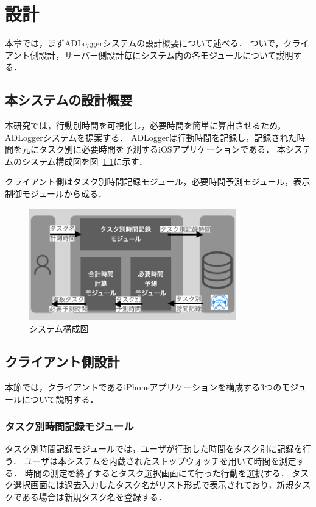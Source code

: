 \chapter{設計}
本章では，まずADLoggerシステムの設計概要について述べる．
ついで，クライアント側設計，サーバー側設計毎にシステム内の各モジュールについて説明する．

\section{本システムの設計概要}
本研究では，行動別時間を可視化し，必要時間を簡単に算出させるため，ADLoggerシステムを提案する．
ADLoggerは行動時間を記録し，記録された時間を元にタスク別に必要時間を予測するiOSアプリケーションである．
本システムのシステム構成図を図~\ref{fig:system}に示す．

クライアント側はタスク別時間記録モジュール，必要時間予測モジュール，表示制御モジュールから成る．

\begin{figure}[tb]
	\begin{center}
	\includegraphics[width=9cm]{images/5/3.png}
	\end{center}
	\caption{システム構成図}
	\label{fig:system}
\end{figure}

\section{クライアント側設計}
本節では，クライアントであるiPhoneアプリケーションを構成する3つのモジュールについて説明する．

\subsection{タスク別時間記録モジュール}
タスク別時間記録モジュールでは，ユーザが行動した時間をタスク別に記録を行う．
ユーザは本システムを内蔵されたストップウォッチを用いて時間を測定する．
時間の測定を終了するとタスク選択画面にて行った行動を選択する．
タスク選択画面には過去入力したタスク名がリスト形式で表示されており，新規タスクである場合は新規タスク名を登録する．

